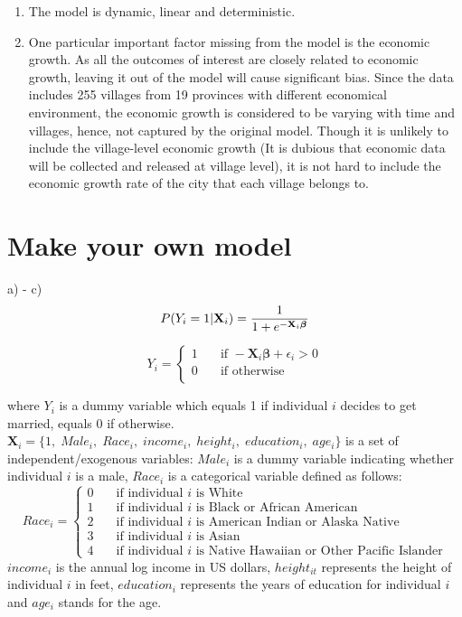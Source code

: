 \documentclass[12pt]{article}
\begin{document}
\begin{enumerate}[label={\alph*)}]
\item The model is dynamic, linear and deterministic.

\item One particular important factor missing from the model is the economic growth. As all the outcomes of interest are closely related to economic growth, leaving it out of the model will cause significant bias. Since the data includes 255 villages from 19 provinces with different economical environment, the economic growth is considered to be varying with time and villages, hence, not captured by the original model. Though it is unlikely to include the village-level economic growth (It is dubious that economic data will be collected and released at village level), it is not hard to include the economic growth rate of the city that each village belongs to.  
\end{enumerate}

\section{Make your own model}
\par a) - c)
    \begin{equation}
        P(Y_{i} = 1| \mathbf{X}_{i}) = \frac{1}{1+ e^{- \mathbf{X}_{i} \boldsymbol{\beta}}} \\
    \end{equation}
    
    \[ Y_i =
  \begin{cases}
        1   & \quad \text {if  } -\mathbf{X}_i\boldsymbol{\beta} + \epsilon_i > 0 \\
        0   & \quad \text{if  otherwise}\\
  \end{cases}
\]
    
where $Y_{i}$ is a dummy variable which equals 1 if individual $i$ decides to get married, equals 0 if otherwise. $\mathbf{X}_{i} = \{1, \; Male_{i}, \; Race_{i},\; income_{i}, \; height_{i},\; education_{i},\; age_{i} \}$ is a set of independent/exogenous variables: $Male_i$ is a dummy variable indicating whether individual $i$ is a male, $Race_i$ is a categorical variable defined as follows:
\[ Race_i =
  \begin{cases}
        0   & \quad \text{if individual  $i$ is White}\\
        1   & \quad \text{if individual $i$ is Black or African American}\\
        2  &  \quad \text{if individual $i$ is American Indian or Alaska Native}\\
        3  & \quad \text{if individual $i$ is Asian}\\
        4  & \quad \text{if individual $i$ is Native Hawaiian or Other Pacific Islander}
  \end{cases}
\]
$income_{i}$ is the annual log income in US dollars, $height_{it}$ represents the height of individual $i$ in feet, $education_{i}$ represents the years of education for individual $i$ and $age_{i}$ stands for the age. 
\end{document}
